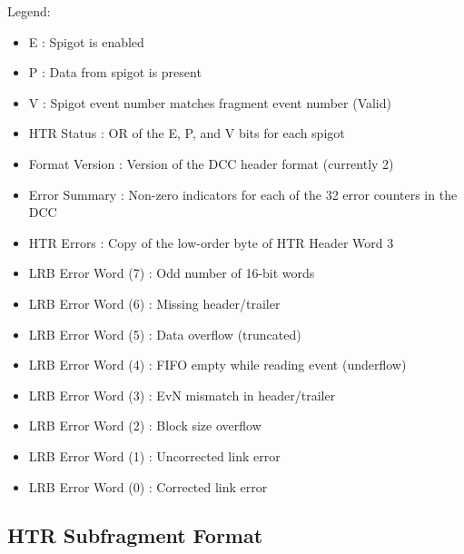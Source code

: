 Legend: 
\begin{itemize}
\item E : Spigot is enabled
\item P : Data from spigot is present
\item V : Spigot event number matches fragment event number (Valid)
\item HTR Status : OR of the E, P, and V bits for each spigot
\item Format Version : Version of the DCC header format (currently 2)
\item Error Summary : Non-zero indicators for each of the 32 error counters in the DCC
\item HTR Errors : Copy of the low-order byte of HTR Header Word 3
\item LRB Error Word (7) : Odd number of 16-bit words
\item LRB Error Word (6) : Missing header/trailer
\item LRB Error Word (5) : Data overflow (truncated)
\item LRB Error Word (4) : FIFO empty while reading event (underflow)
\item LRB Error Word (3) : EvN mismatch in header/trailer
\item LRB Error Word (2) : Block size overflow
\item LRB Error Word (1) : Uncorrected link error
\item LRB Error Word (0) : Corrected link error
\end{itemize}

\subsection{HTR Subfragment Format}\label{sec:HCAL_HTR}

